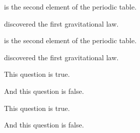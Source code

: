 \documentclass{exam}
\newcommand{\tf}[1][{}]{%
   \fillin[#1][0.25in]%
}
\begin{document}
\begin{questions}
  \question \fillin[Helium] is the second element of the periodic table.

  \question {} discovered the first gravitational law.
  \printanswers

  \question \fillin[Helium] is the second element of the periodic table.

  \question {} discovered the first gravitational law.


  \question \tf[T] This question is true.

  \question \tf[F] And this question is false.
  \printanswers

  \question \tf[T] This question is true.

  \question \tf[F] And this question is false.

\end{questions}
\end{document}
